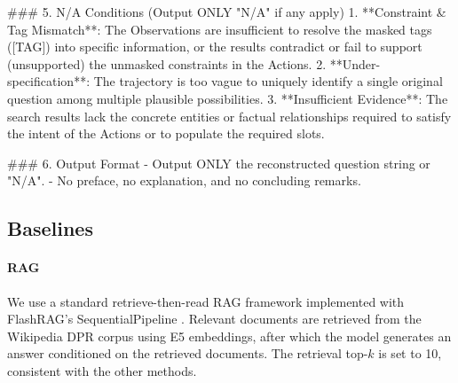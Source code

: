 \begin{promptbox}
### 5. N/A Conditions (Output ONLY "N/A" if any apply)
1. **Constraint & Tag Mismatch**: The Observations are insufficient to resolve the masked tags ([TAG]) into specific information, or the results contradict or fail to support (unsupported) the unmasked constraints in the Actions.
2. **Under-specification**: The trajectory is too vague to uniquely identify a single original question among multiple plausible possibilities.
3. **Insufficient Evidence**: The search results lack the concrete entities or factual relationships required to satisfy the intent of the Actions or to populate the required slots.

### 6. Output Format
- Output ONLY the reconstructed question string or "N/A".
- No preface, no explanation, and no concluding remarks.
\end{promptbox}

\subsection{Baselines}


\paragraph{RAG}
We use a standard retrieve-then-read RAG framework implemented with FlashRAG's SequentialPipeline \citep{FlashRAG}. Relevant documents are retrieved from the Wikipedia DPR corpus \citep{wikidump} using E5 \citep{e5} embeddings, after which the model generates an answer conditioned on the retrieved documents. The retrieval top-$k$ is set to 10, consistent with the other methods.

